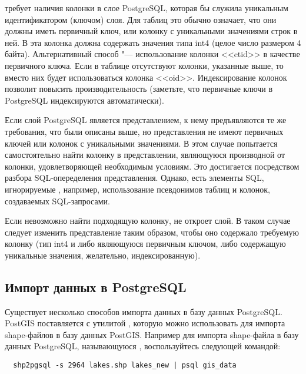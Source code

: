 \qg требует наличия колонки в слое PostgreSQL, которая бы служила уникальным
идентификатором (ключом) слоя. Для таблиц это обычно означает, что они должны
иметь первичный ключ, или колонку с уникальными значениями строк в ней.
В \qg эта колонка должна содержать значения типа int4 (целое число размером
4 байта). Альтернативный способ "--- использование колонки <<ctid>> в качестве
первичного ключа. Если в таблице отсутствуют колонки, указанные выше, то
вместо них будет использоваться колонка <<oid>>. Индексирование колонок позволит
повысить производительность (заметьте, что первичные ключи в PostgreSQL
индексируются автоматически).

Если слой PostgreSQL является представлением, к нему предъявляются те же
требования, что были описаны выше, но представления не имеют первичных
ключей или колонок с уникальными значениями. В этом случае \qg попытается
самостоятельно найти колонку в представлении, являющуюся производной от
колонки, удовлетворяющей необходимым условиям. Это достигается посредством
разбора SQL-опеределения представления. Однако, есть элементы SQL,
игнорируемые \qg, например, использование псевдонимов таблиц и колонок,
создаваемых SQL-запросами.

Если невозможно найти подходящую колонку, \qg не откроет слой. В таком
случае следует изменить представление таким образом, чтобы оно содержало
требуемую колонку (тип int4 и либо являющуюся первичным ключом, либо
содержащую уникальные значения, желательно, индексированную).


\subsection{Импорт данных в PostgreSQL}\label{sec:loading_postgis_data}

Существует несколько способов импорта данных в базу данных PostgreSQL. PostGIS
поставляется с утилитой , которую можно использовать для
импорта shape-файлов в базу данных PostGIS. Например для импорта shape-файла
 в базу данных PostgreSQL, называющуюся
, воспользуйтесь следующей командой:

\begin{verbatim}
  shp2pgsql -s 2964 lakes.shp lakes_new | psql gis_data
\end{verbatim}

